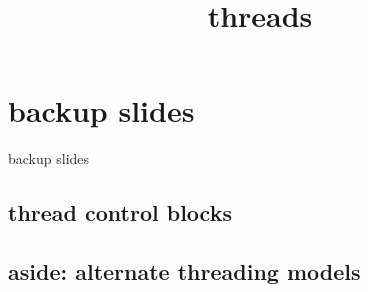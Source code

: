 \graphicspath{{./figures/}}
\title{threads}
\date{}

\begin{frame}
    \titlepage
\end{frame}




\section{backup slides}
\begin{frame}{backup slides}
\end{frame}

\subsection{thread control blocks}


\subsection{aside: alternate threading models}


